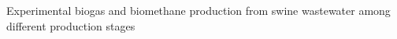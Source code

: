 Experimental biogas and biomethane production from swine wastewater among different production stages